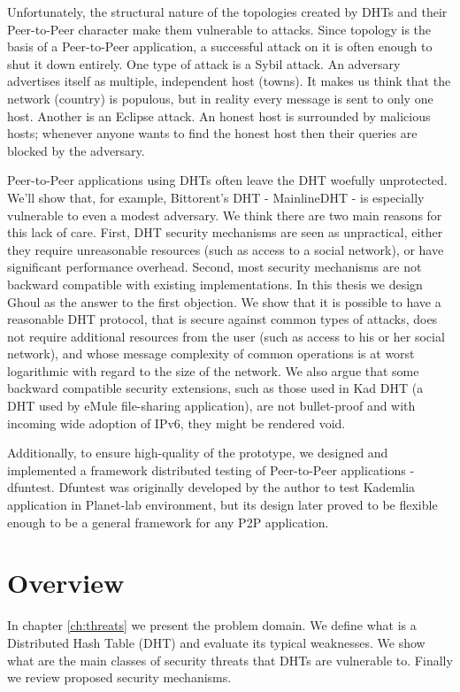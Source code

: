 Unfortunately, the structural nature of the topologies created by DHTs and
their Peer-to-Peer character make them vulnerable to attacks.
Since topology is the basis of a Peer-to-Peer application, a successful attack
on it is often enough to shut it down entirely.
One type of attack is a Sybil attack.
An adversary advertises itself as multiple, independent host (towns).
It makes us think that the network (country) is populous, but in reality every
message is sent to only one host.
Another is an Eclipse attack.
An honest host is surrounded by malicious hosts; whenever anyone wants to find
the honest host then their queries are blocked by the adversary.

Peer-to-Peer applications using DHTs often leave the DHT woefully unprotected.
We'll show that, for example, Bittorent's DHT - MainlineDHT - is especially
vulnerable to even a modest adversary.
We think there are two main reasons for this lack of care.
First, DHT security mechanisms are seen as unpractical, either they require
unreasonable resources (such as access to a social network), or have significant
performance overhead.
Second, most security mechanisms are not backward compatible with existing
implementations.
In this thesis we design Ghoul as the answer to the first objection.
We show that it is possible to have a reasonable DHT protocol, that is secure
against common types of attacks, does not require additional resources from the
user (such as access to his or her social network), and whose message complexity
of common operations is at worst logarithmic with regard to the size of the
network.
We also argue that some backward compatible security extensions, such as those
used in Kad DHT (a DHT used by eMule file-sharing application), are not
bullet-proof and with incoming wide adoption of IPv6, they might be rendered
void.

Additionally, to ensure high-quality of the prototype, we designed and
implemented a framework distributed testing of Peer-to-Peer applications -
dfuntest.
Dfuntest was originally developed by the author to test Kademlia application in
Planet-lab environment, but its design later proved to be flexible enough to be
a general framework for any P2P application.

\section{Overview}
In chapter \ref{ch:threats} we present the problem domain.
We define what is a Distributed Hash Table (DHT) and evaluate its typical
weaknesses.
We show what are the main classes of security threats that DHTs are vulnerable
to.
Finally we review proposed security mechanisms.

